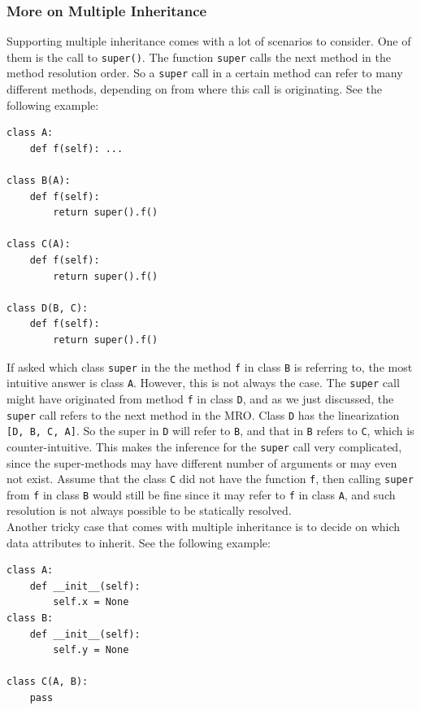 \subsubsection{More on Multiple Inheritance}
Supporting multiple inheritance comes with a lot of scenarios to consider. One of them is the call to \lstinline|super()|. The function \lstinline|super| calls the next method in the method resolution order. So a \lstinline|super| call in a certain method can refer to many different methods, depending on from where this call is originating. See the following example:
\begin{lstlisting}
class A:
	def f(self): ...
		
class B(A):
	def f(self):
		return super().f()
	
class C(A):
	def f(self):
		return super().f()

class D(B, C):
	def f(self):
		return super().f()
\end{lstlisting}

If asked which class \lstinline|super| in the the method \lstinline|f| in class \lstinline|B| is referring to, the most intuitive answer is class \lstinline|A|. However, this is not always the case. The \lstinline|super| call might have originated from method \lstinline|f| in class \lstinline|D|, and as we just discussed, the \lstinline|super| call refers to the next method in the MRO. Class \lstinline|D| has the linearization \lstinline|[D, B, C, A]|. So the super in \lstinline|D| will refer to \lstinline|B|, and that in \lstinline|B| refers to \lstinline|C|, which is counter-intuitive. This makes the inference for the \lstinline|super| call very complicated, since the super-methods may have different number of arguments or may even not exist. Assume that the class \lstinline|C| did not have the function \lstinline|f|, then calling \lstinline|super| from \lstinline|f| in class \lstinline|B| would still be fine since it may refer to \lstinline|f| in class \lstinline|A|, and such resolution is not always possible to be statically resolved.\\

Another tricky case that comes with multiple inheritance is to decide on which data attributes to inherit. See the following example:

\begin{lstlisting}
class A:
	def __init__(self):
		self.x = None
class B:
	def __init__(self):
		self.y = None

class C(A, B):
	pass
\end{lstlisting}

